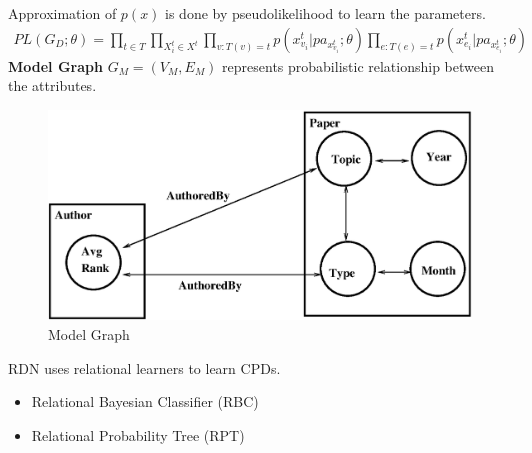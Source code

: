 \documentclass[10pt, blue,subsection=true, compress]{beamer}
\begin{document}
\begin{frame}

Approximation of $p(x)$ is done by pseudolikelihood to learn the parameters.
\begin{align}
\label{plgd}
  PL( G_D; \theta)= \prod_{t \in T} \prod_{X^t_i \in X^t} \prod_{v : T ( v) =t } p(x^t_{v_i} | pa_{x^t_{v_i}} ; \theta ) 
\prod_{e :T( e) =t} p( x^t_{e_i} | pa_{x^t_{e_i}} ; \theta)
\end{align}
 \textbf{Model Graph} $G_M = (V_M, E_M)$ represents probabilistic relationship between the attributes.
\begin{figure}[htbp]
\centering
\includegraphics[scale=0.2]{img/model.eps}
\caption{Model Graph}
\label{fig:3.2}
\end{figure}
 RDN uses relational learners to learn CPDs.
\begin{itemize}
\item {\color{red}Relational Bayesian Classifier (RBC)}
\item Relational Probability Tree (RPT)
\end{itemize}
\end{frame}
\end{document}
